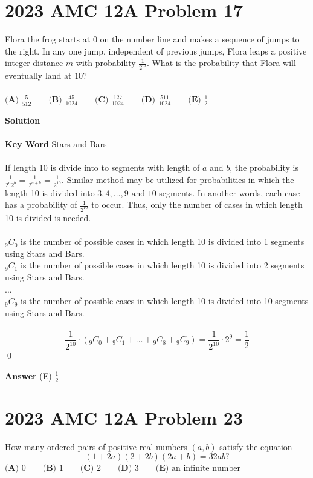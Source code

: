\documentclass{article}
\newenvironment{solution}{\begin{trivlist}\item[]{\bf Solution}}{\qed \end{trivlist}}
\begin{document}
\newpage
\section*{2023 AMC 12A Problem 17}
Flora the frog starts at $0$ on the number line and makes a sequence of jumps to the right. In any one jump, independent of previous jumps, Flora leaps a positive integer distance $m$ with probability $\frac{1}{2^m}$. What is the probability that Flora will eventually land at $10$?
\\\\
$\textbf{(A) } \frac{5}{512} \qquad \textbf{(B) } \frac{45}{1024} \qquad \textbf{(C) } \frac{127}{1024} \qquad \textbf{(D) } \frac{511}{1024} \qquad \textbf{(E) } \frac{1}{2}$

\begin{solution}
\\\\
\textbf{Key Word} Stars and Bars
\\\\
If length 10 is divide into to segments with  length of $a$ and $b$, the probability is $\frac{1}{2^a2^b}=\frac{1}{2^{a+b}}=\frac{1}{2^{10}}$. Similar method may be utilized for probabilities in which the length 10 is divided into $3, 4, \dots,9 \text{ and } 10$ segments. In another words, each case has a probability of $\frac{1}{2^{10}}$ to occur. Thus, only the number of cases in which length 10 is divided is needed.
\\\\
${}_9C_0$ is the number of possible cases in which length 10 is divided into 1 segments using Stars and Bars. \\
${}_9C_1$ is the number of possible cases in which length 10 is divided into 2 segments using Stars and Bars. \\
$\dots$ \\
${}_9C_9$ is the number of possible cases in which length 10 is divided into 10 segments using Stars and Bars.
\\\\
\[
\frac{1}{2^{10}}\cdot({}_9C_0+{}_9C_1+\dots+{}_9C_8+{}_9C_9)=\frac{1}{2^{10}}\cdot2^9=\frac{1}{2}
\]
\end{solution}
\textbf{Answer} (E) $\frac{1}{2}$

\section*{2023 AMC 12A Problem 23}
How many ordered pairs of positive real numbers $(a,b)$ satisfy the equation
\[(1+2a)(2+2b)(2a+b) = 32ab?\]
$\textbf{(A) }0\qquad\textbf{(B) }1\qquad\textbf{(C) }2\qquad\textbf{(D) }3\qquad\textbf{(E) }\text{an infinite number}$
\end{document}
